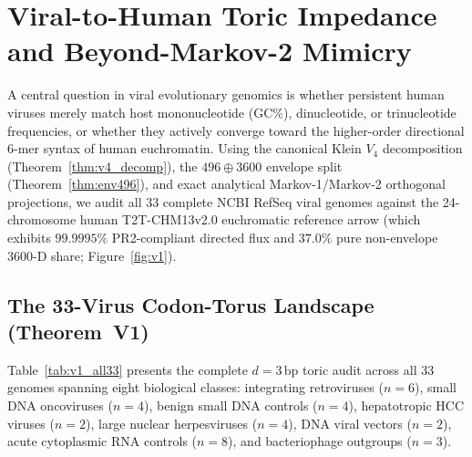 \documentclass[11pt, a4paper]{article}
\DeclareRobustCommand{\_}{\textunderscore\allowbreak}
\begin{document}
\section{Viral-to-Human Toric Impedance and Beyond-Markov-2 Mimicry}
\label{sec:mimicry}

A central question in viral evolutionary genomics is whether persistent human viruses merely match host mononucleotide ($\mathrm{GC}\%$), dinucleotide, or trinucleotide frequencies, or whether they actively converge toward the higher-order directional 6-mer syntax of human euchromatin. Using the canonical Klein $V_4$ decomposition (Theorem~\ref{thm:v4_decomp}), the $496 \oplus 3600$ envelope split (Theorem~\ref{thm:env496}), and exact analytical Markov-1/Markov-2 orthogonal projections, we audit all 33 complete NCBI RefSeq viral genomes against the 24-chromosome human T2T-CHM13v2.0 euchromatic reference arrow (which exhibits $99.9995\%$ PR2-compliant directed flux and $37.0\%$ pure non-envelope 3600-D share; Figure~\ref{fig:v1}).

\subsection{The 33-Virus Codon-Torus Landscape (Theorem~V1)}

Table~\ref{tab:v1_all33} presents the complete $d = 3\,\mathrm{bp}$ toric audit across all 33 genomes spanning eight biological classes: integrating retroviruses ($n = 6$), small DNA oncoviruses ($n = 4$), benign small DNA controls ($n = 4$), hepatotropic HCC viruses ($n = 2$), large nuclear herpesviruses ($n = 4$), DNA viral vectors ($n = 2$), acute cytoplasmic RNA controls ($n = 8$), and bacteriophage outgroups ($n = 3$).
\end{document}
